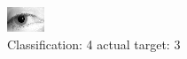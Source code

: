 \begin{figure}[h!]
\begin{center}
\includegraphics[width=0.60\columnwidth]{figures/ID1279_class_4_target_3.png}
\end{center}
\caption{ Classification: 4 actual target: 3}
\label{fig:ID1279_class_4_target_3}
\end{figure}
